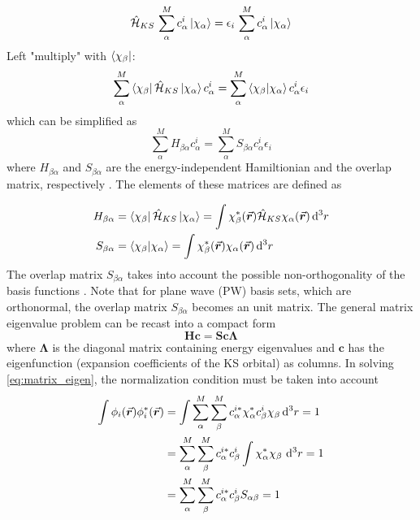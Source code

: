 \begin{equation}\label{eq:KS_basis}
	\hat{\mathcal{H}}_{KS}\,  \sum^M_\alpha c^i_\alpha \ket{\chi_\alpha} = \epsilon_i\,  \sum^M_\alpha c^i_\alpha \ket{\chi_\alpha}
\end{equation}
Left "multiply" with  $\bra{\chi_\beta}$:
\begin{equation}
	\sum^M_\alpha  \bra{\chi_\beta} \hat{\mathcal{H}}_{KS} \ket{\chi_\alpha} c^i_\alpha = \sum^M_\alpha \braket{\chi_\beta}{\chi_\alpha} c^i_\alpha \epsilon_i
\end{equation}
which can be simplified as
\begin{equation}
	\sum^M_\alpha  H_{\beta\alpha} c^i_\alpha = \sum^M_\alpha S_{\beta\alpha} c^i_\alpha \epsilon_i
\end{equation}
where $ H_{\beta\alpha}$ and $S_{\beta\alpha}$ are the energy-independent Hamiltionian and the overlap matrix, respectively \citep{Kohanoff2006}. The elements of these matrices are defined as

\begin{align}
	H_{\beta\alpha} & = \bra{\chi_\beta} \hat{\mathcal{H}}_{KS} \ket{\chi_\alpha} = \int \chi^*_\beta(\va*{r}) \hat{\mathcal{H}}_{KS}\chi_\alpha(\va*{r}) \dd[3]{r} \\
	S_{\beta\alpha} & = \braket{\chi_\beta}{\chi_\alpha} = \int \chi^*_\beta(\va*{r}) \chi_\alpha(\va*{r}) \dd[3]{r}
\end{align}
The overlap matrix $S_{\beta\alpha}$ takes into account the possible non-orthogonality of the basis functions \citep{Woods2019}. Note that for plane wave (PW) basis sets, which are orthonormal, the overlap matrix $S_{\beta\alpha}$ becomes an unit matrix. The general matrix eigenvalue problem can be recast into a compact form \citep{Requist2008}
\begin{equation} \label{eq:matrix_eigen}
	\bm{H c =  S c \Lambda}
\end{equation}
where $\bm{\Lambda}$ is the diagonal matrix containing energy eigenvalues and  $\bm{c}$ has the eigenfunction (expansion coefficients of the KS orbital) as columns. In solving \eqref{eq:matrix_eigen}, the normalization condition must be taken into account
\begin{align}
	\int \phi_i(\va*{r}) \phi^*_i(\va*{r}) & = \int \sum^M_\alpha \sum^M_\beta c^{i*}_\alpha \chi^*_\alpha c^i_\beta \chi_\beta \dd[3]{r} = 1    \\
	                                       & = \sum^M_\alpha \sum^M_\beta c^{i*}_\alpha c^i_\beta \int \chi^*_\alpha  \chi_\beta\, \dd[3]{r} = 1 \\
	                                       & = \sum^M_\alpha \sum^M_\beta c^{i*}_\alpha c^i_\beta S_{\alpha\beta} = 1 \label{eq:orbital_norm}
\end{align}

